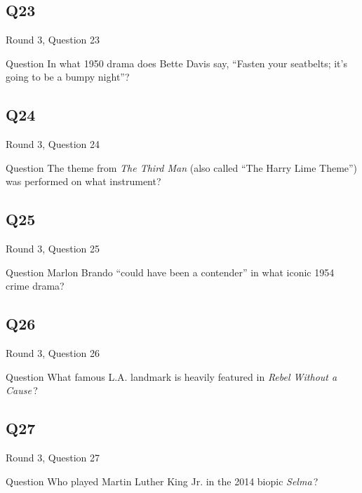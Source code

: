 \documentclass[11pt]{beamer}
\begin{document}
\subsection*{Q23}
\begin{frame}[t]{Round 3, Question 23}
\vspace{2em}
\begin{block}{Question}
In what 1950 drama does Bette Davis say, ``Fasten your seatbelts; it's going to be a bumpy night''?
\end{block}
\end{frame}
    

\subsection*{Q24}
\begin{frame}[t]{Round 3, Question 24}
\vspace{2em}
\begin{block}{Question}
The theme from \emph{The Third Man} (also called ``The Harry Lime Theme'') was performed on what instrument?
\end{block}
\end{frame}
    

\subsection*{Q25}
\begin{frame}[t]{Round 3, Question 25}
\vspace{2em}
\begin{block}{Question}
Marlon Brando ``could have been a contender'' in what iconic 1954 crime drama?
\end{block}
\end{frame}
    

\subsection*{Q26}
\begin{frame}[t]{Round 3, Question 26}
\vspace{2em}
\begin{block}{Question}
What famous L.A. landmark is heavily featured in \emph{Rebel Without a Cause}\,?
\end{block}
\end{frame}
    

\subsection*{Q27}
\begin{frame}[t]{Round 3, Question 27}
\vspace{2em}
\begin{block}{Question}
Who played Martin Luther King Jr. in the 2014 biopic \emph{Selma}\,?
\end{block}
\end{frame}
    
\end{document}
